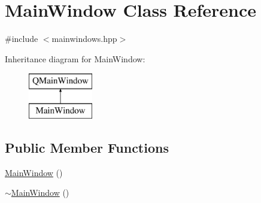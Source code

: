 \hypertarget{class_main_window}{\section{Main\+Window Class Reference}
\label{class_main_window}
}


{\ttfamily \#include $<$mainwindows.\+hpp$>$}

Inheritance diagram for Main\+Window\+:\begin{figure}[H]
\begin{center}
\leavevmode
\includegraphics[height=2.000000cm]{class_main_window}
\end{center}
\end{figure}
\subsection*{Public Member Functions}
\begin{DoxyCompactItemize}
\item 
\hyperlink{class_main_window_a34c4b4207b46d11a4100c9b19f0e81bb}{Main\+Window} ()
\item 
\hyperlink{class_main_window_ae98d00a93bc118200eeef9f9bba1dba7}{$\sim$\+Main\+Window} ()
\end{DoxyCompactItemize}
